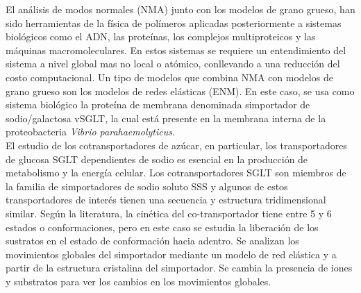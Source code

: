 El an\'{a}lisis de modos normales (NMA) junto con los modelos de grano grueso, han sido herramientas de la f\'{i}sica de pol\'{i}meros aplicadas posteriormente a sistemas biol\'{o}gicos como el ADN, las prote\'{i}nas, los complejos multiproteicos y  las m\'{a}quinas macromoleculares. En estos sistemas se requiere un entendimiento del sistema a nivel global mas no local o at\'{o}mico, conllevando a una  reducci\'{o}n del costo computacional. Un tipo de modelos que combina NMA con modelos de grano grueso son los modelos de redes el\'{a}sticas (ENM). En este caso, se usa como sistema biol\'{o}gico la prote\'{i}na de membrana denominada simportador de sodio/galactosa vSGLT, la cual est\'{a} presente en la membrana interna de la proteobacteria \textit{Vibrio parahaemolyticus}.\\

El estudio de los cotransportadores de az\'{u}car, en particular, los transportadores de glucosa SGLT dependientes de sodio es esencial en la producci\'{o}n de metabolismo y la energ\'{i}a celular. Los cotransportadores SGLT son miembros de la familia de simportadores de sodio soluto SSS y algunos de estos transportadores de inter\'{e}s tienen una secuencia y estructura tridimensional similar. Seg\'{u}n la literatura, la cin\'{e}tica del co-transportador tiene entre 5 y 6 estados o conformaciones, pero en este caso se estudia la liberaci\'{o}n de los sustratos en el estado de conformaci\'{o}n hacia adentro. Se analizan los movimientos globales del simportador mediante un modelo de red el\'{a}stica y a partir de la estructura cristalina del simportador. Se cambia la presencia de iones y substratos para ver los cambios en los movimientos globales.\\

